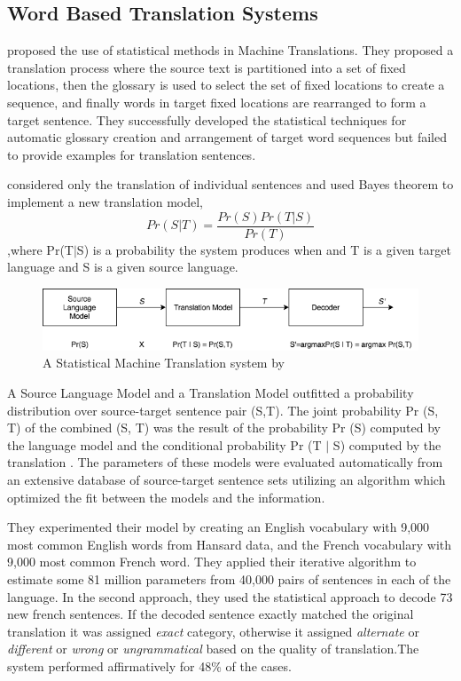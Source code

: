 \subsection{Word Based Translation Systems}
\cite{Brown:1988:SAL:991635.991651} proposed the use of statistical methods in Machine Translations. They proposed a translation process where the source text is partitioned into a set of fixed locations, then the glossary is used  to select the set of fixed locations to create a sequence, and finally words in target fixed locations are rearranged to form a target sentence. They successfully developed the statistical techniques for automatic glossary creation and arrangement of target word sequences but failed to provide examples for translation sentences.

\cite{Brown:1990:SAM:92858.92860}   considered only the translation of individual
sentences and used Bayes theorem to implement a new translation model, 
\begin{equation*}
    Pr(S|T)= \frac{Pr (S) Pr (T|S) }{Pr (T) }
\end{equation*}
,where Pr(T$|$S) is a probability the system produces when and T is a given target language and  S is a given source language. 

\begin{figure}[h]
\includegraphics[width=\textwidth]{figures/wbmt.png}
\caption{
A Statistical Machine Translation system  by \cite{Brown:1990:SAM:92858.92860} } \label{wbmt}
\end{figure}

A Source Language Model and a Translation Model outfitted a probability distribution over source-target sentence pair (S,T). The joint probability Pr (S, T) of the combined (S, T) was the result of the probability Pr (S) computed by the language model and the conditional probability Pr (T $|$ S) computed by the translation . The parameters of these models were evaluated automatically from an extensive database of source-target sentence sets utilizing an algorithm which optimized the fit between the models and the information.

They experimented their model by creating an English vocabulary with 9,000 most common English words from Hansard data, and the French vocabulary with 9,000 most common French word. They applied their iterative algorithm to estimate some 81 million parameters from 40,000 pairs of sentences in each of the language. In the second approach, they used the statistical approach to decode 73 new french sentences. If the decoded sentence exactly matched the original translation it was assigned \textit{exact} category, otherwise it assigned \textit{alternate} or \textit{different} or \textit{wrong} or \textit{ungrammatical} based on the quality of translation.The system performed affirmatively for 48\% of the cases.

